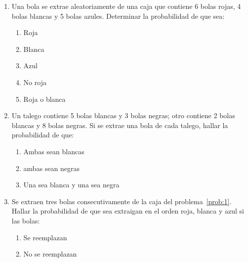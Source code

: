 \documentclass[fleqn]{article}
\begin{document}
 
\begin{enumerate}
	\item \label{prob:1} Una bola se extrae aleatoriamente de una caja que contiene 6 bolas rojas, 4 bolas blancas y 5 bolas azules. Determinar la probabilidad de que sea:
	\begin{enumerate}
	\item Roja \noanswer
	\item Blanca \noanswer
	\item Azul\noanswer
	\item No roja \noanswer
	\item Roja o blanca\noanswer
	\end{enumerate}
	\newpage
   \item Un talego contiene 5 bolas blancas y 3 bolas negras; otro contiene 2 bolas blancas y 8 bolas negras. Si se extrae una bola de cada talego, hallar la probabilidad de que:
      \begin{enumerate}
	 \item Ambas sean blancas\noanswer
	 \item ambas sean negras \noanswer
	 \item Una sea blanca y una sea negra\noanswer
      \end{enumerate}
   \item Se extraen tres bolas consecutivamente de la caja del problema~\ref{prob:1}. Hallar la probabilidad de que sea extraigan en el orden roja, blanca y azul si las bolas:
   \begin{enumerate}
   \item Se reemplazan\noanswer
   \item No se reemplazan\noanswer
   \end{enumerate}
   \end{enumerate}
\end{document}
